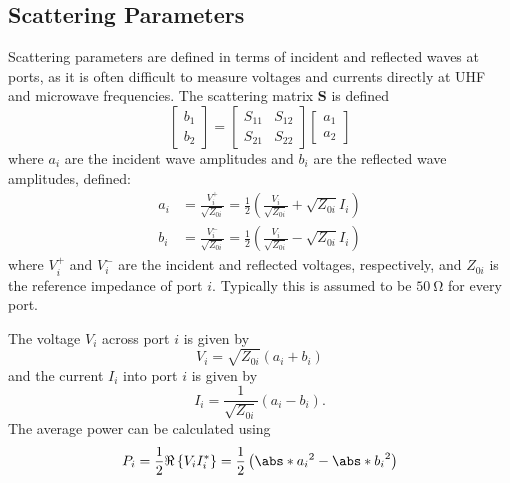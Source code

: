 \documentclass{article}
\begin{document}
\subsection{Scattering Parameters}
Scattering parameters are defined in terms of incident and reflected
waves at ports, as it is often difficult to measure voltages and
currents directly at UHF and microwave frequencies. The scattering
matrix \(\symbf{S}\) is defined
\begin{equation*}
    \begin{bmatrix}
        b_1 \\
        b_2
    \end{bmatrix}
    =
    \begin{bmatrix}
        S_{11} & S_{12} \\
        S_{21} & S_{22}
    \end{bmatrix}
    \begin{bmatrix}
        a_1 \\
        a_2
    \end{bmatrix}
\end{equation*}
where \(a_i\) are the incident wave amplitudes and \(b_i\) are the
reflected wave amplitudes, defined:
\begin{align*}
    a_i & = \frac{V_i^+}{\sqrt{Z_{0i}}} = \frac{1}{2} \left( \frac{V_i}{\sqrt{Z_{0i}}} + \sqrt{Z_{0i}} I_i \right) \\
    b_i & = \frac{V_i^-}{\sqrt{Z_{0i}}} = \frac{1}{2} \left( \frac{V_i}{\sqrt{Z_{0i}}} - \sqrt{Z_{0i}} I_i \right)
\end{align*}
where \(V_i^+\) and \(V_i^-\) are the incident and reflected voltages,
respectively, and \(Z_{0i}\) is the reference impedance of port
\(i\). Typically this is assumed to be \(\qty{50}{\ohm}\) for every port.

The voltage \(V_i\) across port \(i\) is given by
\begin{equation*}
    V_i = \sqrt{Z_{0i}} \left( a_i + b_i \right)
\end{equation*}
and the current \(I_i\) into port \(i\) is given by
\begin{equation*}
    I_i = \frac{1}{\sqrt{Z_{0i}}} \left( a_i - b_i \right).
\end{equation*}
The average power can be calculated using
\begin{equation*}
    P_i = \frac{1}{2} \Re\left\{ V_i I_i^* \right\} = \frac{1}{2} \left( \abs*{a_i}^2 - \abs*{b_i}^2 \right)
\end{equation*}
\end{document}
